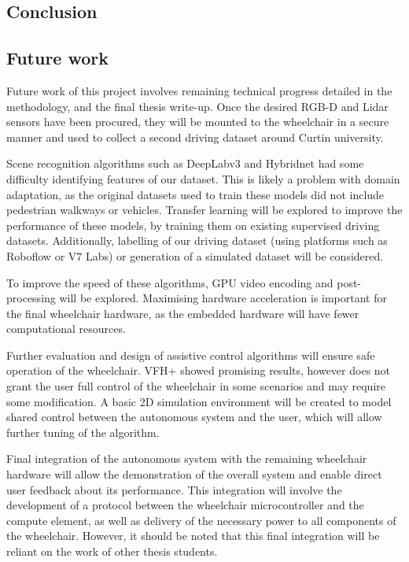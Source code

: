 \subsection{Conclusion}

\subsection{Future work}
\label{sec:future_work}
Future work of this project involves remaining technical progress detailed in the methodology,
and the final thesis write-up.
Once the desired RGB-D and Lidar sensors have been procured, they will be mounted to the wheelchair
in a secure manner and used to collect a second driving dataset around Curtin university.

Scene recognition algorithms such as DeepLabv3 and Hybridnet
had some difficulty identifying features of our dataset. This is likely a problem with domain adaptation,
as the original datasets used to train these models did not include pedestrian walkways or vehicles.
Transfer learning will be explored to improve the performance of these
models, by training them on existing supervised driving datasets.
Additionally, labelling of our driving dataset (using platforms such as Roboflow or V7 Labs)
or generation of a simulated dataset will be considered.

To improve the speed of these algorithms, GPU video encoding and post-processing will be explored.
Maximising hardware acceleration is important for the final wheelchair hardware, as the embedded hardware will have fewer
computational resources.

Further evaluation and design of assistive control algorithms will ensure safe operation of the wheelchair.
VFH+ showed promising results, however does not grant the user full control of the wheelchair
in some scenarios and may require some modification. A basic 2D simulation environment will be created
to model shared control between the autonomous system and the user, which will allow further tuning
of the algorithm.

Final integration of the autonomous system with the remaining wheelchair hardware
will allow the demonstration of the overall system and enable direct user feedback about its performance.
This integration will involve the development of a protocol between the wheelchair microcontroller and the compute
element, as well as delivery of the necessary power to all components of the wheelchair.
However, it should be noted that this final integration will be reliant on the work of other thesis students.


